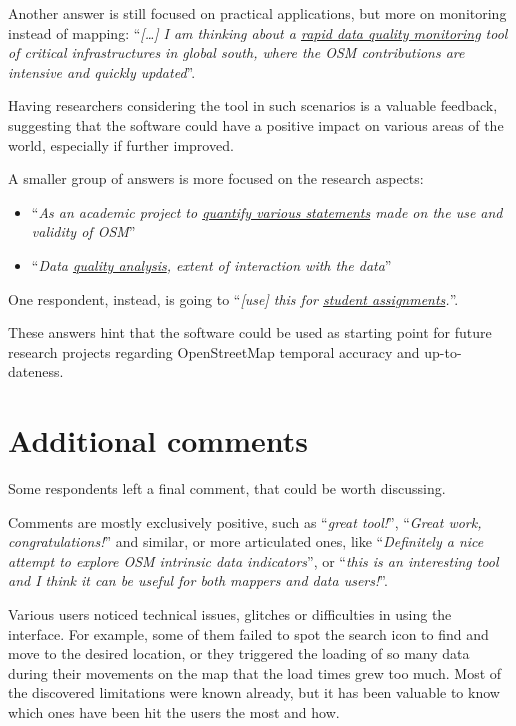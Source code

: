 \documentclass{Configuration_Files/PoliMi3i_thesis}
\begin{document}
Another answer is still focused on practical applications, but more on monitoring instead of mapping: “\textit{[…] I am thinking about a \underline{rapid data quality monitoring} tool of critical infrastructures in global south, where the OSM contributions are intensive and quickly updated}”.

Having researchers considering the tool in such scenarios is a valuable feedback, suggesting that the software could have a positive impact on various areas of the world, especially if further improved.


A smaller group of answers is more focused on the research aspects:

\begin{itemize}
\item “\textit{As an academic project to \underline{quantify various statements} made on the use and validity of OSM}”
\item “\textit{Data \underline{quality analysis}, extent of interaction with the data}”
\end{itemize}

One respondent, instead, is going to “\textit{[use] this for \underline{student assignments}.}”.

These answers hint that the software could be used as starting point for future research projects regarding OpenStreetMap temporal accuracy and up-to-dateness.

\section{Additional comments}
\label{sc:additional_comments}

Some respondents left a final comment, that could be worth discussing.

Comments are mostly exclusively positive, such as “\textit{great tool!}”, “\textit{Great work, congratulations!}” and similar, or more articulated ones, like “\textit{Definitely a nice attempt to explore OSM intrinsic data indicators}”, or “\textit{this is an interesting tool and I think it can be useful for both mappers and data users!}”.

Various users noticed technical issues, glitches or difficulties in using the interface. For example, some of them failed to spot the search icon to find and move to the desired location, or they triggered the loading of so many data during their movements on the map that the load times grew too much.
Most of the discovered limitations were known already, but it has been valuable to know which ones have been hit the users the most and how.
\end{document}
